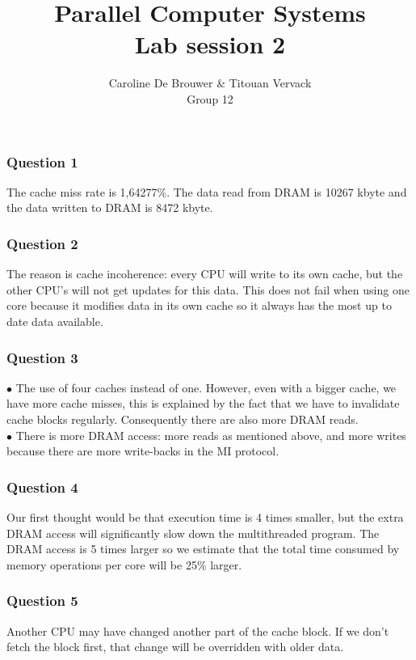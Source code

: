 \documentclass[12pt,a4paper,oneside]{article}
\begin{document}
  \title{Parallel Computer Systems \\ Lab session 2}
  \author{Caroline De Brouwer \& Titouan Vervack \\ Group 12}
  \date{}
  \maketitle
  
\subsubsection*{Question 1}
The cache miss rate is 1,64277\%. The data read from DRAM is 10267 kbyte and the data written to DRAM is 8472 kbyte.
  
\subsubsection*{Question 2}
The reason is cache incoherence: every CPU will write to its own cache, but the other CPU's will not get updates for this data. This does not fail when using one core because it modifies data in its own cache so it always has the most up to date data available.

\subsubsection*{Question 3}
$\bullet$ The use of four caches instead of one. However, even with a bigger cache, we have more cache misses, this is explained by the fact that we have to invalidate cache blocks regularly. Consequently there are also more DRAM reads.\\
$\bullet$ There is more DRAM access: more reads as mentioned above, and more writes because there are more write-backs in the MI protocol.

\subsubsection*{Question 4}
Our first thought would be that execution time is 4 times smaller, but the extra DRAM access will significantly slow down the multithreaded program. The DRAM access is 5 times larger so we estimate that the total time consumed by memory operations per core will be 25\% larger. 

\subsubsection*{Question 5}
Another CPU may have changed another part of the cache block. If we don't fetch the block first, that change will be overridden with older data.
\end{document}
